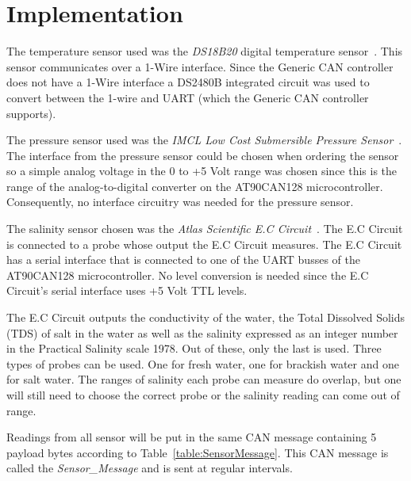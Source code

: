 
\section{Implementation}\label{sec:implementation}
The temperature sensor used was the \emph{DS18B20} digital temperature sensor~\cite{web:ds18b20}. This sensor communicates over a 1-Wire interface. Since the Generic CAN controller does not have a 1-Wire interface a DS2480B integrated circuit was used to convert between the 1-wire and UART (which the Generic CAN controller supports).

The pressure sensor used was the \emph{IMCL Low Cost Submersible Pressure Sensor}~\cite{web:imcl}. The interface from the pressure sensor could be chosen when ordering the sensor so a simple analog voltage in the 0 to +5 Volt range was chosen since this is the range of the analog-to-digital converter on the AT90CAN128 microcontroller. Consequently, no interface circuitry was needed for the pressure sensor.

The salinity sensor chosen was the \emph{Atlas Scientific E.C Circuit}~\cite{web:ec_circuit}. The E.C Circuit is connected to a probe whose output the E.C Circuit measures. The E.C Circuit has a serial interface that is connected to one of the UART busses of the AT90CAN128 microcontroller. No level conversion is needed since the E.C Circuit's serial interface uses +5 Volt TTL levels.

The E.C Circuit outputs the conductivity of the water, the Total Dissolved Solids (TDS) of salt in the water as well as the salinity expressed as an integer number in the Practical Salinity scale 1978. Out of these, only the last is used. \newline
Three types of probes can be used. One for fresh water, one for brackish water and one for salt water. The ranges of salinity each probe can measure do overlap, but one will still need to choose the correct probe or the salinity reading can come out of range. 

Readings from all sensor will be put in the same CAN message containing 5 payload bytes according to Table~\ref{table:SensorMessage}. This CAN message is called the \emph{Sensor\_Message} and is sent at regular intervals.

